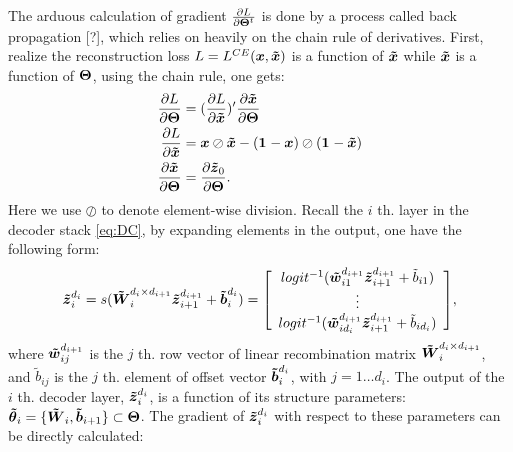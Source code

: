 The arduous calculation of gradient $\frac{\partial L}{\partial \boldsymbol{\Theta}^t}$ is done by a process called back propagation [?], which relies on heavily on the chain rule of derivatives. First, realize the reconstruction loss $L=L^{CE}(\boldsymbol{x}, \boldsymbol{\tilde{x}})$ is a function of $\boldsymbol{\tilde{x}}$ while $\boldsymbol{\tilde{x}}$ is a function of $\boldsymbol{\Theta}$, using the chain rule, one gets:
\begin{equation*}
\begin{split}
  \frac{\partial L}{\partial \boldsymbol{\Theta}} &= (\frac{\partial L}{\partial \boldsymbol{\tilde{x}}})^{\prime} \frac{\partial \boldsymbol{\tilde{x}}}{\partial \boldsymbol{\Theta}} \\
  \frac{\partial L}{\partial \boldsymbol{\tilde{x}}} &= \boldsymbol{x} \oslash \boldsymbol{\tilde{x}} -  (\boldsymbol{1}^{} - \boldsymbol{x}) \oslash (\boldsymbol{1}^{} - \boldsymbol{\tilde{x}}) \\
  \frac{\partial \boldsymbol{\tilde{x}}}{\partial \boldsymbol{\Theta}} &= \frac{\partial \boldsymbol{\tilde{z}}_0}{\partial \boldsymbol{\Theta}}.
\end{split}
\end{equation*}
Here we use $\oslash$ to denote element-wise division. 
Recall the $i$ th. layer in the decoder stack \ref{eq:DC}, by expanding elements in the output, one have the following form:
\begin{equation*}
\begin{split}
  \boldsymbol{\tilde{z}}_i^{d_i} &= s(\boldsymbol{\tilde{W}}_i^{d_i \times d_{i+1}} \boldsymbol{\tilde{z}}_{i+1}^{d_{i+1}} + \boldsymbol{\tilde{b}}_i^{d_i})
  = \left[ \begin{array}{c}
    logit^{-1}(\boldsymbol{\tilde{w}}_{i1}^{d_{i+1}} \boldsymbol{\tilde{z}}_{i+1}^{d_{i+1}} + \tilde{b}_{i1}) \\
    \vdots \\
    logit^{-1}(\boldsymbol{\tilde{w}}_{id_i}^{d_{i+1}} \boldsymbol{\tilde{z}}_{i+1}^{d_{i+1}} + \tilde{b}_{id_i}) \\
  \end{array} \right] \\
\end{split},
\end{equation*}
where $\boldsymbol{\tilde{w}}_{ij}^{d_{i+1}}$ is the $j$ th. row vector of linear recombination matrix $\boldsymbol{\tilde{W}}_i^{d_i \times d_{i+1}}$, and $\tilde{b}_{ij}$ is the $j$ th. element of offset vector $\boldsymbol{\tilde{b}}_i^{d_i}$, with $j=1 \dots d_i$. The output of the $i$ th. decoder layer, $\boldsymbol{\tilde{z}}_i^{d_i}$, is a function of its structure parameters: $\boldsymbol{\tilde{\theta}}_i = \{\boldsymbol{\tilde{W}}_i, \boldsymbol{\tilde{b}}_{i+1}\} \subset \boldsymbol{\Theta}$. The gradient of $\boldsymbol{\tilde{z}}_i^{d_i}$ with respect to these parameters can be directly calculated:
